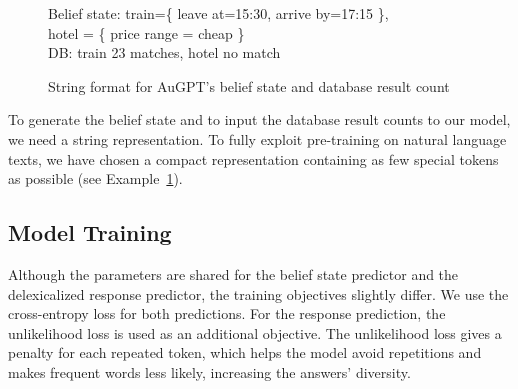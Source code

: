 \documentclass[letterpaper]{article} %
\newcommand{\exampleref}[1]{Example~\ref{#1}}
\newenvironment{example}{\begin{figure}[!ht]}{\end{figure}}
\newcommand{\exampleref}[1]{Figure~\ref{#1}}
\begin{document}
\begin{example}
\begin{mdframed}[style=ExampleFrame]
Belief state: train=\{ leave at=15:30, arrive by=17:15 \}, \\
\-\hspace{10pt}hotel = \{ price range = cheap \} \\
DB: train 23 matches, hotel no match
\end{mdframed}
\caption{String format for AuGPT's belief state and database result count\label{ex:augpt_format}}
\end{example}

To generate the belief state and to input the database result counts to our model, we need a string representation. To fully exploit pre-training on natural language texts, we have chosen a compact representation containing as few special tokens as possible (see \exampleref{ex:augpt_format}).


\subsection{Model Training}
Although the parameters are shared for the belief state predictor and the delexicalized response predictor, the training objectives slightly differ. We use the cross-entropy loss for both predictions. For the response prediction, the unlikelihood loss \cite{welleck2019,li_dont_2020} is used as an additional objective. The unlikelihood loss gives a penalty for each repeated token, which helps the model avoid repetitions and makes frequent words less likely, increasing the answers' diversity.
\end{document}
